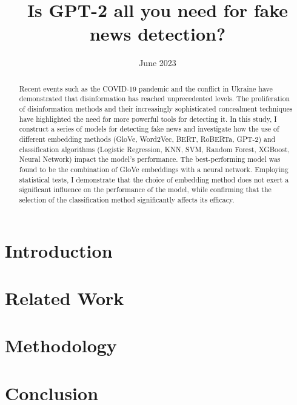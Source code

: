 \documentclass[magisterska,en]{mgr}
\title{Is GPT-2 all you need for fake news detection?}
\date{June 2023}
\begin{document}
\maketitle

\begin{abstract}
    Recent events such as the COVID-19 pandemic and the conflict in Ukraine have demonstrated that disinformation has reached unprecedented levels. The proliferation of disinformation methods and their increasingly sophisticated concealment techniques have highlighted the need for more powerful tools for detecting it. 
    In this study, I construct a series of models for detecting fake news and investigate how the use of different embedding methods (GloVe, Word2Vec, BERT, RoBERTa, GPT-2) and classification algorithms (Logistic Regression, KNN, SVM, Random Forest, XGBoost, Neural Network) impact the model's performance. The best-performing model was found to be the combination of GloVe embeddings with a neural network. Employing statistical tests, I demonstrate that the choice of embedding method does not exert a significant influence on the performance of the model, while confirming that the selection of the classification method significantly affects its efficacy.
\end{abstract}

\tableofcontents


\chapter*{Introduction}


\chapter{Related Work}\label{r:related_work}


\chapter{Methodology}\label{r:methodology}


\chapter{Conclusion}\label{r:conclusion}

\end{document}
